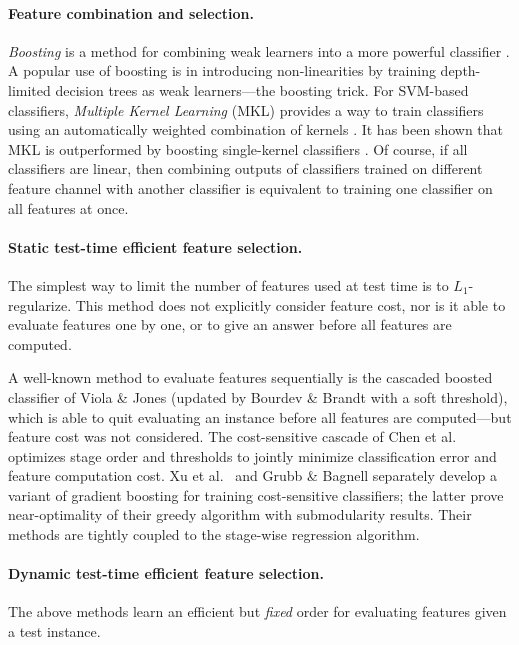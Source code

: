 \paragraph{Feature combination and selection.}
\emph{Boosting} is a method for combining weak learners into a more powerful classifier \parencite{Hastie2009}.
A popular use of boosting is in introducing non-linearities by training depth-limited decision trees as weak learners---the boosting trick.
For SVM-based classifiers, \emph{Multiple Kernel Learning} (MKL) provides a way to train classifiers using an automatically weighted combination of kernels \parencite{Lanckriet2004}.
It has been shown that MKL is outperformed by boosting single-kernel classifiers \parencite{Gehler2009}.
Of course, if all classifiers are linear, then combining outputs of classifiers trained on different feature channel with another classifier is equivalent to training one classifier on all features at once.

\paragraph{Static test-time efficient feature selection.}
The simplest way to limit the number of features used at test time is to $L_1$-regularize.
This method does not explicitly consider feature cost, nor is it able to evaluate features one by one, or to give an answer before all features are computed.

A well-known method to evaluate features sequentially is the cascaded boosted classifier of Viola \& Jones \parencite{Viola2004} (updated by Bourdev \& Brandt \parencite{Bourdev-CVPR-2005} with a soft threshold), which is able to quit evaluating an instance before all features are computed---but feature cost was not considered.
The cost-sensitive cascade of Chen et al.\ \parencite{Chen-AISTATS-2012} optimizes stage order and thresholds to jointly minimize classification error and feature computation cost.
Xu et al.\ \parencite{Xu-ICML-2012} and Grubb \& Bagnell \parencite{Grubb-AISTATS-2012} separately develop a variant of gradient boosting for training cost-sensitive classifiers; the latter prove near-optimality of their greedy algorithm with submodularity results.
Their methods are tightly coupled to the stage-wise regression algorithm.

\paragraph{Dynamic test-time efficient feature selection.}
The above methods learn an efficient but \emph{fixed} order for evaluating features given a test instance.

